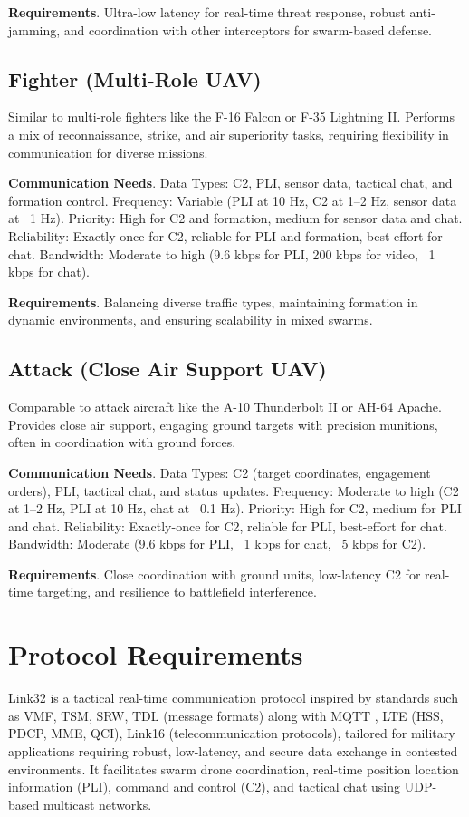 \documentclass{article}
\begin{document}
\textbf{Requirements}.
Ultra-low latency for real-time threat response, robust anti-jamming,
and coordination with other interceptors for swarm-based defense.

\subsection{Fighter (Multi-Role UAV)}
Similar to multi-role fighters like the F-16 Falcon or F-35 Lightning II.
Performs a mix of reconnaissance, strike, and air superiority tasks, requiring flexibility in communication for diverse missions.

\textbf{Communication Needs}.
Data Types: C2, PLI, sensor data, tactical chat, and formation control.
Frequency: Variable (PLI at 10 Hz, C2 at 1–2 Hz, sensor data at ~1 Hz).
Priority: High for C2 and formation, medium for sensor data and chat.
Reliability: Exactly-once for C2, reliable for PLI and formation, best-effort for chat.
Bandwidth: Moderate to high (9.6 kbps for PLI, 200 kbps for video, ~1 kbps for chat).

\textbf{Requirements}.
Balancing diverse traffic types, maintaining formation in dynamic environments,
and ensuring scalability in mixed swarms.

\subsection{Attack (Close Air Support UAV)}
Comparable to attack aircraft like the A-10 Thunderbolt II or AH-64 Apache.
Provides close air support, engaging ground targets with precision munitions,
often in coordination with ground forces.

\textbf{Communication Needs}.
Data Types: C2 (target coordinates, engagement orders), PLI, tactical chat, and status updates.
Frequency: Moderate to high (C2 at 1–2 Hz, PLI at 10 Hz, chat at ~0.1 Hz).
Priority: High for C2, medium for PLI and chat.
Reliability: Exactly-once for C2, reliable for PLI, best-effort for chat.
Bandwidth: Moderate (9.6 kbps for PLI, ~1 kbps for chat, ~5 kbps for C2).

\textbf{Requirements}.
Close coordination with ground units, low-latency C2 for real-time targeting,
and resilience to battlefield interference.

\newpage
\section{Protocol Requirements}
Link32 is a tactical real-time communication protocol inspired by standards such as
VMF, TSM, SRW, TDL \cite{tdl} (message formats) along with MQTT \cite{mqtt5},
LTE (HSS, PDCP, MME, QCI), Link16 \cite{link16std} (telecommunication protocols),
tailored for military applications requiring robust, low-latency, and secure data
exchange in contested environments. It facilitates swarm drone coordination,
real-time position location information (PLI), command and control (C2),
and tactical chat using UDP-based multicast networks.
\end{document}
